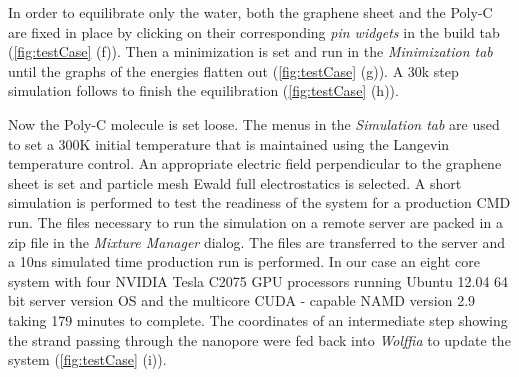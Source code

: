 \documentclass{article}
\begin{document}
In order to equilibrate only the water, both the graphene sheet and the Poly-C are fixed in place by clicking on their corresponding \textit{pin widgets} in the build tab (\ref{fig:testCase} (f)).  Then a minimization is set and run in the \textit{Minimization tab} until the graphs of the energies flatten out (\ref{fig:testCase} (g)).  A 30k step simulation follows to finish the equilibration (\ref{fig:testCase} (h)).

Now the Poly-C molecule is set loose.  The menus in the \textit{Simulation tab} are used to set a 300K  initial temperature that is maintained using the Langevin temperature control.  An appropriate electric field perpendicular to the graphene sheet is set and particle mesh Ewald full electrostatics is selected.  A short simulation is performed to test the readiness of the system for a production CMD run.  The files necessary to run the simulation on a remote server are packed in a zip file in the \textit{Mixture Manager} dialog.  The files are transferred to the server and a 10ns simulated time production run is performed.  In our case an eight core system with four NVIDIA Tesla C2075 GPU processors running Ubuntu 12.04 64 bit server version OS and the multicore CUDA - capable NAMD version 2.9 taking 179 minutes to complete.  The coordinates of an intermediate step showing the strand passing through the nanopore were fed back into \textit{Wolffia} to update the system (\ref{fig:testCase} (i)).
\end{document}
